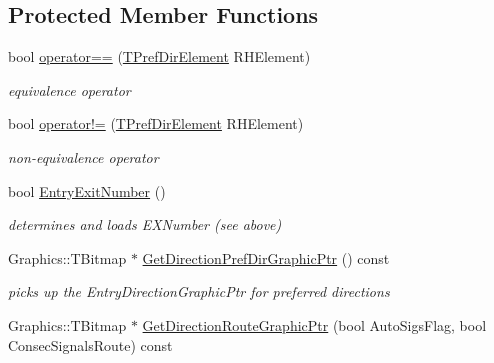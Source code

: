 \subsection*{Protected Member Functions}
\begin{DoxyCompactItemize}
\item 
\mbox{\label{class_t_pref_dir_element_a2f8b222ba3f5990c095d5a4e120681c1}} 
bool \mbox{\hyperlink{class_t_pref_dir_element_a2f8b222ba3f5990c095d5a4e120681c1}{operator==}} (\mbox{\hyperlink{class_t_pref_dir_element}{T\+Pref\+Dir\+Element}} R\+H\+Element)
\begin{DoxyCompactList}\small\item\em equivalence operator \end{DoxyCompactList}\item 
\mbox{\label{class_t_pref_dir_element_a22ed5d6b16c6b53f7c3229231791d35e}} 
bool \mbox{\hyperlink{class_t_pref_dir_element_a22ed5d6b16c6b53f7c3229231791d35e}{operator!=}} (\mbox{\hyperlink{class_t_pref_dir_element}{T\+Pref\+Dir\+Element}} R\+H\+Element)
\begin{DoxyCompactList}\small\item\em non-\/equivalence operator \end{DoxyCompactList}\item 
\mbox{\label{class_t_pref_dir_element_ae8ee9f59578f80d23aebfdb9fff041d4}} 
bool \mbox{\hyperlink{class_t_pref_dir_element_ae8ee9f59578f80d23aebfdb9fff041d4}{Entry\+Exit\+Number}} ()
\begin{DoxyCompactList}\small\item\em determines and loads E\+X\+Number (see above) \end{DoxyCompactList}\item 
\mbox{\label{class_t_pref_dir_element_a13526cb4ee94a708a7bfef517abaa605}} 
Graphics\+::\+T\+Bitmap $\ast$ \mbox{\hyperlink{class_t_pref_dir_element_a13526cb4ee94a708a7bfef517abaa605}{Get\+Direction\+Pref\+Dir\+Graphic\+Ptr}} () const
\begin{DoxyCompactList}\small\item\em picks up the Entry\+Direction\+Graphic\+Ptr for preferred directions \end{DoxyCompactList}\item 
Graphics\+::\+T\+Bitmap $\ast$ \mbox{\hyperlink{class_t_pref_dir_element_a5d03028241e6c38e473882120d5bcc68}{Get\+Direction\+Route\+Graphic\+Ptr}} (bool Auto\+Sigs\+Flag, bool Consec\+Signals\+Route) const

\end{DoxyCompactItemize}
